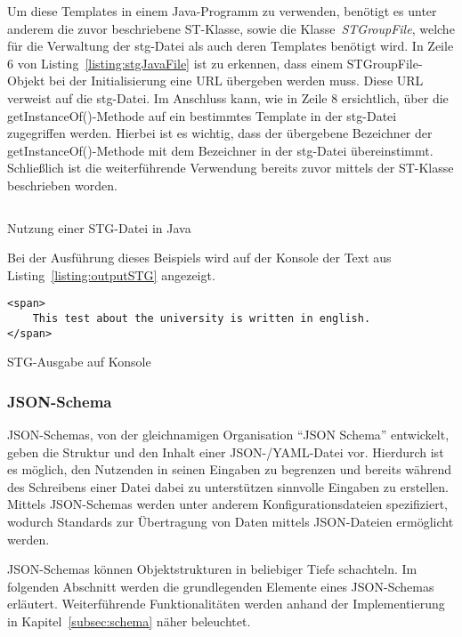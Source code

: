 Um diese Templates in einem Java-Programm zu verwenden, benötigt es unter anderem die zuvor beschriebene ST-Klasse, sowie
die Klasse~\textit{STGroupFile}, welche für die Verwaltung der stg-Datei als auch deren Templates benötigt wird.
In Zeile 6 von Listing~\ref{listing:stgJavaFile} ist zu erkennen, dass einem STGroupFile-Objekt bei der Initialisierung eine URL übergeben werden muss.
Diese URL verweist auf die stg-Datei.
Im Anschluss kann, wie in Zeile 8 ersichtlich, über die getInstanceOf()-Methode auf ein bestimmtes Template in der stg-Datei zugegriffen werden.
Hierbei ist es wichtig, dass der übergebene Bezeichner der getInstanceOf()-Methode mit dem Bezeichner in der stg-Datei übereinstimmt.
Schließlich ist die weiterführende Verwendung bereits zuvor mittels der ST-Klasse beschrieben worden.

\begin{listing}[!ht]
    \inputminted{java}{listings/2.2.1/JavaSTGExample.java}
    \caption{Nutzung einer STG-Datei in Java}
    \label{listing:stgJavaFile}
\end{listing}

Bei der Ausführung dieses Beispiels wird auf der Konsole der Text aus Listing~\ref{listing:outputSTG} angezeigt.

\begin{listing}[!ht]
    \begin{verbatim}
<span>
    This test about the university is written in english.
</span>
    \end{verbatim}
    \caption{STG-Ausgabe auf Konsole}
    \label{listing:outputSTG}
\end{listing}

\subsubsection{JSON-Schema}\label{subsubsec:json-schema}
JSON-Schemas, von der gleichnamigen Organisation ``JSON Schema'' entwickelt, geben die Struktur und den Inhalt einer JSON-/YAML-Datei vor\cite*{jsonSchema}.
Hierdurch ist es möglich, den Nutzenden in seinen Eingaben zu begrenzen und bereits während des Schreibens einer Datei dabei zu unterstützen sinnvolle Eingaben zu erstellen.
Mittels JSON-Schemas werden unter anderem Konfigurationsdateien spezifiziert, wodurch Standards zur Übertragung von Daten mittels JSON-Dateien ermöglicht werden.

JSON-Schemas können Objektstrukturen in beliebiger Tiefe schachteln.
Im folgenden Abschnitt werden die grundlegenden Elemente eines JSON-Schemas erläutert.
Weiterführende Funktionalitäten werden anhand der Implementierung in Kapitel~\ref{subsec:schema} näher beleuchtet.

